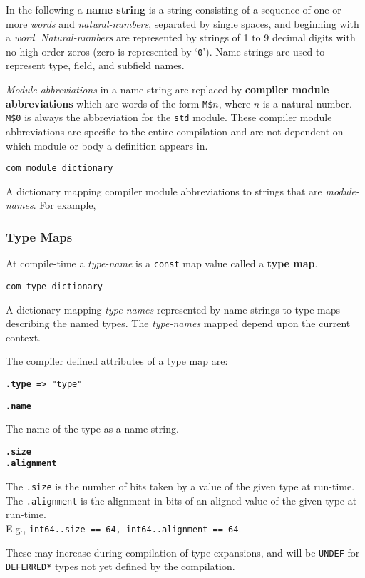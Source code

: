 \documentclass[12pt]{article}
\newcommand{\key}[1]{{\rm \bfseries #1}}
\newcommand{\ttkey}[1]{{\tt \bfseries #1}}
\newenvironment{indpar}[1][0.3in]%
	{\begin{list}{}%
		     {\setlength{\itemsep}{0in}%
		      \setlength{\topsep}{0in}%
		      \setlength{\parsep}{1ex}%
		      \setlength{\labelwidth}{#1}%
		      \setlength{\leftmargin}{#1}%
		      \addtolength{\leftmargin}{\labelsep}}%
	 \item}%
	{\end{list}}
\begin{document}
In the following a \key{name string} is a string
consisting of a sequence of one or more {\em words}
and {\em natural-numbers}, separated
by single spaces, and beginning with a {\em word}.
{\em Natural-numbers} are represented
by strings of 1 to 9 decimal digits with no high-order
zeros (zero is represented by `{\tt 0}').
Name strings are used to represent type, field, and subfield
names.

{\em Module abbreviations} in a name string are
replaced by \key{compiler module abbreviations}
which are words of the form {\tt M\$$n$}, where
$n$ is a natural number.  {\tt M\$0} is always
the abbreviation for the {\tt std} module.
These compiler module abbreviations are specific to the
entire compilation and are not dependent on which
module or body a definition appears in.

{\tt com module dictionary}
\begin{indpar}
A dictionary mapping compiler module abbreviations
to strings that are {\em module-names}.  For example,
\\
\hspace*{1.5in}{\tt com module dictionary["M\$0"] == "standard"}
\end{indpar}

\subsubsection{Type Maps}
\label{TYPE-MAPS}

At compile-time a {\em type-name} is a {\tt const} map value
called a \key{type map}.

{\tt com type dictionary}
\begin{indpar}
A dictionary mapping {\em type-names}
represented by name strings to type maps describing the
named types.  The {\em type-names} mapped depend upon
the current context.
\end{indpar}

The compiler defined attributes of a type map are:

{\tt \ttkey{.type} => "type"}

\ttkey{.name}
\begin{indpar}
The name of the type as a name string.
\end{indpar}

\ttkey{.size} \\
\ttkey{.alignment}
\begin{indpar}
The {\tt .size} is the number of bits taken by a value of the given type at
run-time.
The {\tt .alignment} is the alignment in bits
of an aligned value of the given type at
run-time.
\\ E.g., {\tt int64..size == 64, int64..alignment == 64}.

These may increase during compilation of type expansions, and will be
{\tt UNDEF} for {\tt *DEFERRED*} types not yet defined by the
compilation.
\end{indpar}
\end{document}
